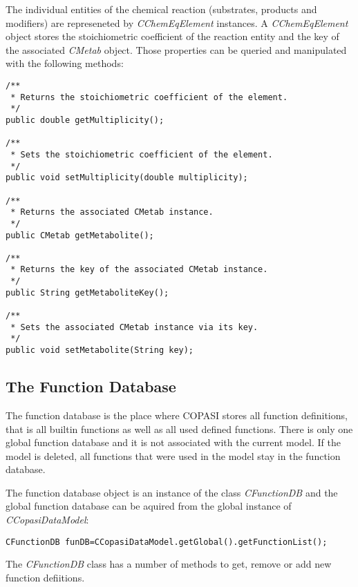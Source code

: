 \documentclass[a4,12pt]{article}
\begin{document}
The individual entities of the chemical reaction (substrates, products and modifiers) are
represeneted by \textit{CChemEqElement} instances. A \textit{CChemEqElement} object stores the stoichiometric coefficient of the reaction entity  and the key of the associated \textit{CMetab} object. Those properties can be queried and manipulated with the following methods:

\begin{lstlisting}
/**
 * Returns the stoichiometric coefficient of the element.
 */
public double getMultiplicity();

/**
 * Sets the stoichiometric coefficient of the element.
 */
public void setMultiplicity(double multiplicity);

/**
 * Returns the associated CMetab instance.
 */
public CMetab getMetabolite();

/**
 * Returns the key of the associated CMetab instance.
 */
public String getMetaboliteKey();

/**
 * Sets the associated CMetab instance via its key.
 */
public void setMetabolite(String key);
\end{lstlisting}

\subsection{The Function Database}
The function database is the place where COPASI stores all function definitions, that is all builtin functions as well as all used defined functions. There is only one global function database and it is not associated with the current model. If the model is deleted, all functions that were used in the model stay in the function database.

The function database object is an instance of the class \textit{CFunctionDB} and the global function database can be aquired from the global instance of \textit{CCopasiDataModel}:

\begin{lstlisting}
CFunctionDB funDB=CCopasiDataModel.getGlobal().getFunctionList();
\end{lstlisting}

The \textit{CFunctionDB} class has a number of methods to get, remove or add new function defiitions.
\end{document}
